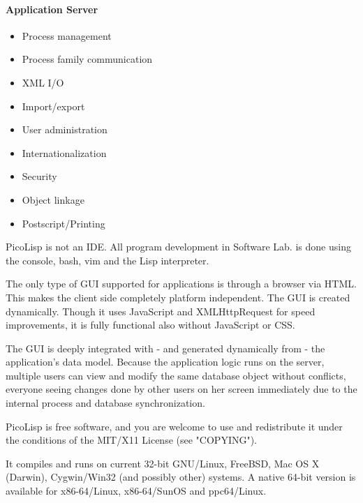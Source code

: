 \paragraph{Application Server} 
\label{par:readme-application-server}

  \begin{itemize}
    \item Process management
    \item Process family communication
    \item XML I/O
    \item Import/export
    \item User administration
    \item Internationalization
    \item Security
    \item Object linkage
    \item Postscript/Printing
  \end{itemize}


PicoLisp is not an IDE. All program development in Software Lab. is
done using the console, bash, vim and the Lisp interpreter.

The only type of GUI supported for applications is through a browser
via HTML. This makes the client side completely platform independent.
The GUI is created dynamically. Though it uses JavaScript and
XMLHttpRequest for speed improvements, it is fully functional also
without JavaScript or CSS.

The GUI is deeply integrated with - and generated dynamically from -
the application's data model. Because the application logic runs on
the server, multiple users can view and modify the same database
object without conflicts, everyone seeing changes done by other users
on her screen immediately due to the internal process and database
synchronization.

PicoLisp is free software, and you are welcome to use and redistribute
it under the conditions of the MIT/X11 License (see "COPYING").

It compiles and runs on current 32-bit GNU/Linux, FreeBSD, Mac OS X
(Darwin), Cygwin/Win32 (and possibly other) systems. A native 64-bit
version is available for x86-64/Linux, x86-64/SunOS and ppc64/Linux.


